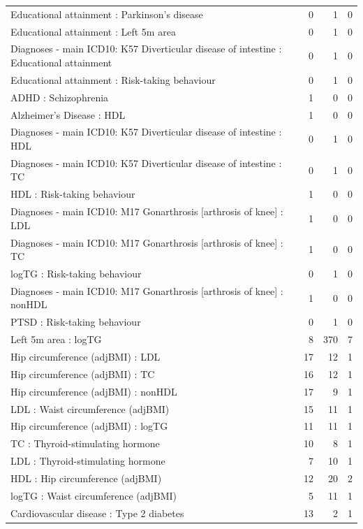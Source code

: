 \begin{table}[ht]
\begin{tabular}{lrrr}
  Educational attainment : Parkinson's disease &   0 &   1 &   0 \\ 
  Educational attainment : Left 5m area &   0 &   1 &   0 \\ 
  Diagnoses - main ICD10: K57 Diverticular disease of intestine : Educational attainment &   0 &   1 &   0 \\ 
  Educational attainment : Risk-taking behaviour &   0 &   1 &   0 \\ 
  ADHD : Schizophrenia &   1 &   0 &   0 \\ 
  Alzheimer's Disease : HDL &   1 &   0 &   0 \\ 
  Diagnoses - main ICD10: K57 Diverticular disease of intestine : HDL &   0 &   1 &   0 \\ 
  Diagnoses - main ICD10: K57 Diverticular disease of intestine : TC &   0 &   1 &   0 \\ 
  HDL : Risk-taking behaviour &   1 &   0 &   0 \\ 
  Diagnoses - main ICD10: M17 Gonarthrosis [arthrosis of knee] : LDL &   1 &   0 &   0 \\ 
  Diagnoses - main ICD10: M17 Gonarthrosis [arthrosis of knee] : TC &   1 &   0 &   0 \\ 
  logTG : Risk-taking behaviour &   0 &   1 &   0 \\ 
  Diagnoses - main ICD10: M17 Gonarthrosis [arthrosis of knee] : nonHDL &   1 &   0 &   0 \\ 
  PTSD : Risk-taking behaviour &   0 &   1 &   0 \\ 
  Left 5m area : logTG &   8 & 370 &   7 \\ 
  Hip circumference (adjBMI) : LDL &  17 &  12 &   1 \\ 
  Hip circumference (adjBMI) : TC &  16 &  12 &   1 \\ 
  Hip circumference (adjBMI) : nonHDL &  17 &   9 &   1 \\ 
  LDL : Waist circumference (adjBMI) &  15 &  11 &   1 \\ 
  Hip circumference (adjBMI) : logTG &  11 &  11 &   1 \\ 
  TC : Thyroid-stimulating hormone  &  10 &   8 &   1 \\ 
  LDL : Thyroid-stimulating hormone  &   7 &  10 &   1 \\ 
  HDL : Hip circumference (adjBMI) &  12 &  20 &   2 \\ 
  logTG : Waist circumference (adjBMI) &   5 &  11 &   1 \\ 
  Cardiovascular disease : Type 2 diabetes &  13 &   2 &   1 \\ 

\end{tabular}
\end{table}
